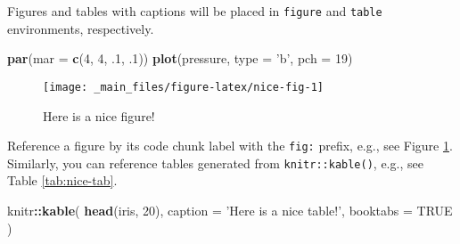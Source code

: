 \documentclass[]{book}
\newenvironment{Shaded}{\begin{snugshade}}{\end{snugshade}}
\newcommand{\DataTypeTok}[1]{\textcolor[rgb]{0.13,0.29,0.53}{#1}}
\newcommand{\DecValTok}[1]{\textcolor[rgb]{0.00,0.00,0.81}{#1}}
\newcommand{\FloatTok}[1]{\textcolor[rgb]{0.00,0.00,0.81}{#1}}
\newcommand{\KeywordTok}[1]{\textcolor[rgb]{0.13,0.29,0.53}{\textbf{#1}}}
\newcommand{\NormalTok}[1]{#1}
\newcommand{\OperatorTok}[1]{\textcolor[rgb]{0.81,0.36,0.00}{\textbf{#1}}}
\newcommand{\OtherTok}[1]{\textcolor[rgb]{0.56,0.35,0.01}{#1}}
\newcommand{\StringTok}[1]{\textcolor[rgb]{0.31,0.60,0.02}{#1}}
\begin{document}
Figures and tables with captions will be placed in \texttt{figure} and \texttt{table} environments, respectively.

\begin{Shaded}
\begin{Highlighting}[]
\KeywordTok{par}\NormalTok{(}\DataTypeTok{mar =} \KeywordTok{c}\NormalTok{(}\DecValTok{4}\NormalTok{, }\DecValTok{4}\NormalTok{, }\FloatTok{.1}\NormalTok{, }\FloatTok{.1}\NormalTok{))}
\KeywordTok{plot}\NormalTok{(pressure, }\DataTypeTok{type =} \StringTok{'b'}\NormalTok{, }\DataTypeTok{pch =} \DecValTok{19}\NormalTok{)}
\end{Highlighting}
\end{Shaded}

\begin{figure}

{\centering \texttt{[image: \_main\_files/figure-latex/nice-fig-1]} 

}

\caption{Here is a nice figure!}\label{fig:nice-fig}
\end{figure}

Reference a figure by its code chunk label with the \texttt{fig:} prefix, e.g., see Figure \ref{fig:nice-fig}. Similarly, you can reference tables generated from \texttt{knitr::kable()}, e.g., see Table \ref{tab:nice-tab}.

\begin{Shaded}
\begin{Highlighting}[]
\NormalTok{knitr}\OperatorTok{::}\KeywordTok{kable}\NormalTok{(}
  \KeywordTok{head}\NormalTok{(iris, }\DecValTok{20}\NormalTok{), }\DataTypeTok{caption =} \StringTok{'Here is a nice table!'}\NormalTok{,}
  \DataTypeTok{booktabs =} \OtherTok{TRUE}
\NormalTok{)}
\end{Highlighting}
\end{Shaded}
\end{document}

